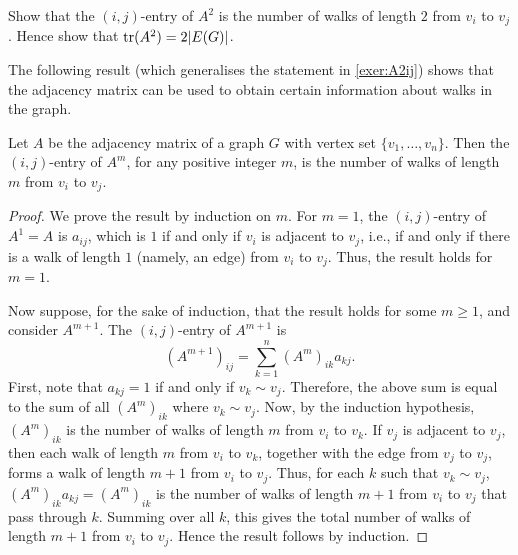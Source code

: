 \begin{Exercise}\label{exer:A2ij}
Show that the $(i,j)$-entry of $A^2$ is the number of walks of length $2$ from $v_i$ to $v_j$. Hence show that $\trace(A^2) = 2|E(G)|$.\\
\end{Exercise}

The following result (which generalises the statement in \cref{exer:A2ij}) shows that the adjacency matrix can be used to obtain certain information about walks in the graph.

\begin{Theorem}
Let $A$ be the adjacency matrix of a graph $G$ with vertex set $\{v_1, \ldots, v_n\}$. Then the $(i,j)$-entry of $A^m$, for any positive integer $m$, is the number of walks of length $m$ from $v_i$ to $v_j$.
\end{Theorem}

\begin{proof}
We prove the result by induction on $m$. For $m = 1$, the $(i,j)$-entry of $A^1 = A$ is $a_{ij}$, which is $1$ if and only if $v_i$ is adjacent to $v_j$, i.e., if and only if there is a walk of length $1$ (namely, an edge) from $v_i$ to $v_j$. Thus, the result holds for $m = 1$.

Now suppose, for the sake of induction, that the result holds for some $m \ge 1$, and consider $A^{m + 1}$. The $(i,j)$-entry of $A^{m + 1}$ is
\begin{equation*}
(A^{m + 1})_{ij} = \sum_{k = 1}^{n} (A^m)_{ik} a_{kj}.
\end{equation*}
First, note that $a_{kj} = 1$ if and only if $v_k \sim v_j$. Therefore, the above sum is equal to the sum of all $(A^m)_{ik}$ where $v_k \sim v_j$. Now, by the induction hypothesis, $(A^m)_{ik}$ is the number of walks of length $m$ from $v_i$ to $v_k$. If $v_j$ is adjacent to $v_j$, then each walk of length $m$ from $v_i$ to $v_k$, together with the edge from $v_j$ to $v_j$, forms a walk of length $m + 1$ from $v_i$ to $v_j$. Thus, for each $k$ such that $v_k \sim v_j$, $(A^m)_{ik} a_{kj} = (A^m)_{ik}$ is the number of walks of length $m + 1$ from $v_i$ to $v_j$ that pass through $k$. Summing over all $k$, this gives the total number of walks of length $m + 1$ from $v_i$ to $v_j$. Hence the result follows by induction.
\end{proof}

